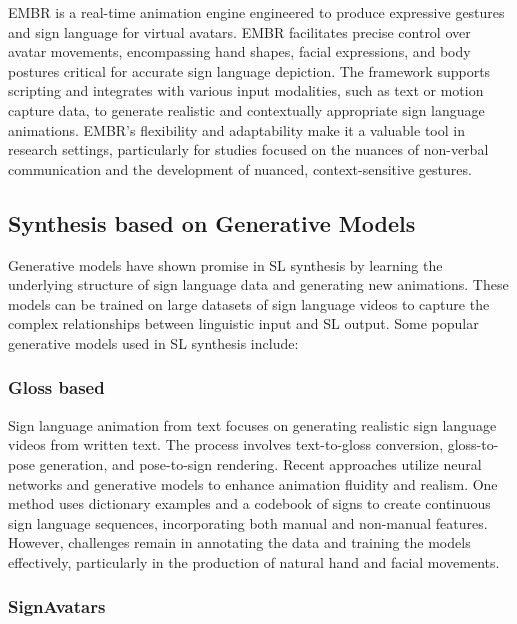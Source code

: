 \documentclass[../../main.tex]{subfiles}
\begin{document}
EMBR is a real-time animation engine engineered to produce expressive gestures and sign language for virtual avatars. EMBR facilitates precise control over avatar movements, encompassing hand shapes, facial expressions, and body postures critical for accurate sign language depiction. The framework supports scripting and integrates with various input modalities, such as text or motion capture data, to generate realistic and contextually appropriate sign language animations. EMBR's flexibility and adaptability make it a valuable tool in research settings, particularly for studies focused on the nuances of non-verbal communication and the development of nuanced, context-sensitive gestures.

\subsection{Synthesis based on Generative Models}
\label{subsec:synthesis_based_on_generative_models}

Generative models have shown promise in SL synthesis by learning the underlying structure of sign language data and generating new animations. These models can be trained on large datasets of sign language videos to capture the complex relationships between linguistic input and SL output. Some popular generative models used in SL synthesis include:

\subsubsection{Gloss based}
\label{subsubsec:gloss_based}

Sign language animation from text focuses on generating realistic sign language videos from written text. The process involves text-to-gloss conversion, gloss-to-pose generation, and pose-to-sign rendering. Recent approaches utilize neural networks and generative models to enhance animation fluidity and realism. One method uses dictionary examples and a codebook of signs to create continuous sign language sequences, incorporating both manual and non-manual features. However, challenges remain in annotating the data and training the models effectively, particularly in the production of natural hand and facial movements.

\subsubsection{SignAvatars}
\label{subsubsec:signavatars}
\end{document}
